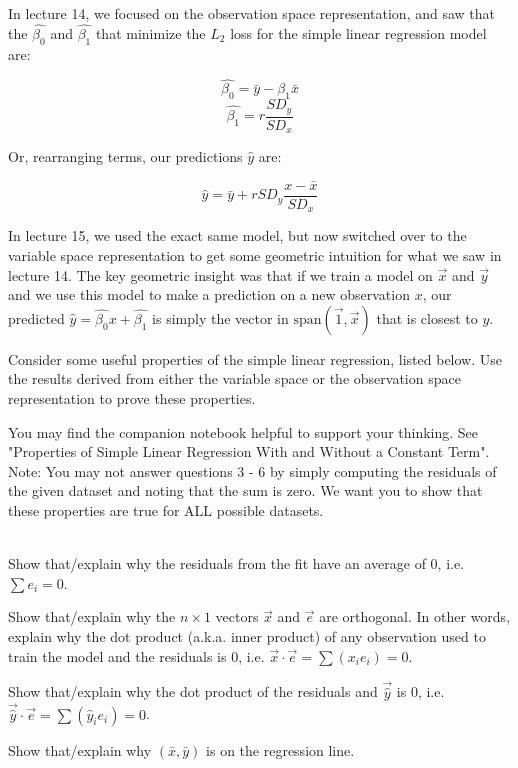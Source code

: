 \documentclass[addpoints, 12pt]{exam}
\begin{document}
\begin{questions}
In lecture 14, we focused on the observation space representation, and saw that the $\hat{\beta_0}$ and $\hat{\beta_1}$ that minimize the $L_2$ loss for the simple linear regression model are:

$$\hat{\beta_0} = \bar{y} - {\beta_1}\bar{x} $$
$$\hat{\beta_1} = r\frac{SD_y}{SD_x}$$

Or, rearranging terms, our predictions $\hat{y}$ are:

$$\hat{y} = \bar{y} + r SD_y \frac{x - \bar{x}}{SD_x}$$

In lecture 15, we used the exact same model, but now switched over to the variable space representation to get some geometric intuition for what we saw in lecture 14. The key geometric insight was that if we train a model on $\vec{x}$ and $\vec{y}$ and we use this model to make a prediction on a new observation $x$, our predicted $\hat{y} = \hat{\beta_0} x + \hat{\beta_1}$ is simply the vector in $\text{span}(\vec{1}, \vec{x})$ that is closest to $y$. 

Consider some useful properties of the simple linear regression, listed below. Use the results derived from either the variable space or the observation space representation to prove these properties. 

You may find the companion notebook helpful to support your thinking. See "Properties of Simple Linear Regression With and Without a Constant Term". Note: You may not answer questions 3 - 6 by simply computing the residuals of the given dataset and noting that the sum is zero. We want you to show that these properties are true for ALL possible datasets.

\\


\question Show that/explain why the residuals from the fit have an average of 0, i.e. $\sum e_i = 0$.

\question Show that/explain why the $n \times 1$ vectors $\vec{x}$ and $\vec{e}$ are orthogonal. In other words, 
explain why the dot product (a.k.a. inner product) of any observation used to train the model and the residuals is 0, i.e.
 $\vec{x} \cdot \vec{e} = \sum(x_i e_i) = 0$.
 
\question Show that/explain why the dot product of the residuals and $\vec{\hat{y}}$ is 0, i.e. $\vec{\hat{y}} \cdot \vec{e} = \sum(\hat{y}_i e_i) = 0$.

\question Show that/explain why $(\bar{x}, \bar{y})$ is on the regression line.

\newpage 


\end{questions}
\end{document}
